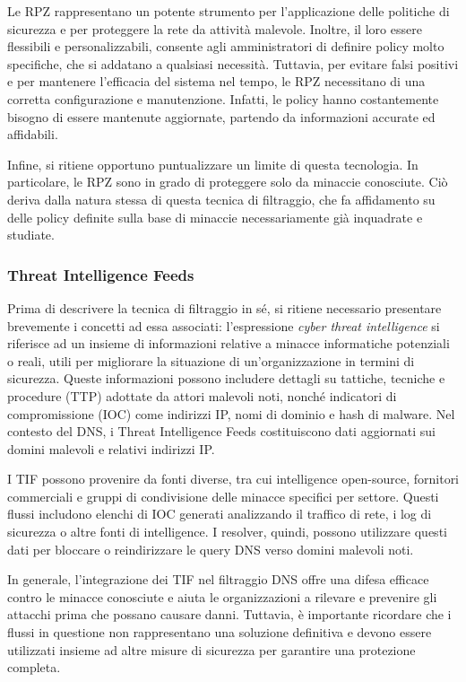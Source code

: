 Le RPZ rappresentano un potente strumento per l'applicazione delle politiche di sicurezza e per proteggere la rete da attività malevole. Inoltre, il loro essere flessibili e personalizzabili, consente agli amministratori di definire policy molto specifiche, che si addatano a qualsiasi necessità. Tuttavia, per evitare falsi positivi e per mantenere l'efficacia del sistema nel tempo, le RPZ necessitano di una corretta configurazione e manutenzione. Infatti, le policy hanno costantemente bisogno di essere mantenute aggiornate, partendo da informazioni accurate ed affidabili.

Infine, si ritiene opportuno puntualizzare un limite di questa tecnologia. In particolare, le RPZ sono in grado di proteggere solo da minaccie conosciute. Ciò deriva dalla natura stessa di questa tecnica di filtraggio, che fa affidamento su delle policy definite sulla base di minaccie necessariamente già inquadrate e studiate.

\subsubsection{Threat Intelligence Feeds}
Prima di descrivere la tecnica di filtraggio in sé, si ritiene necessario presentare brevemente i concetti ad essa associati: l'espressione \textit{cyber threat intelligence} si riferisce ad un insieme di informazioni relative a minacce informatiche potenziali o reali, utili per migliorare la situazione di un'organizzazione in termini di sicurezza.
%
Queste informazioni possono includere dettagli su tattiche, tecniche e procedure (TTP) adottate da attori malevoli noti, nonché indicatori di compromissione (IOC) come indirizzi IP, nomi di dominio e hash di malware. Nel contesto del DNS, i Threat Intelligence Feeds costituiscono dati aggiornati sui domini malevoli e relativi indirizzi IP.

I TIF possono provenire da fonti diverse, tra cui intelligence open-source, fornitori commerciali e gruppi di condivisione delle minacce specifici per settore. Questi flussi includono elenchi di IOC generati analizzando il traffico di rete, i log di sicurezza o altre fonti di intelligence. I resolver, quindi, possono utilizzare questi dati per bloccare o reindirizzare le query DNS verso domini malevoli noti.

In generale, l'integrazione dei TIF nel filtraggio DNS offre una difesa efficace contro le minacce conosciute e aiuta le organizzazioni a rilevare e prevenire gli attacchi prima che possano causare danni. Tuttavia, è importante ricordare che i flussi in questione non rappresentano una soluzione definitiva e devono essere utilizzati insieme ad altre misure di sicurezza per garantire una protezione completa.

